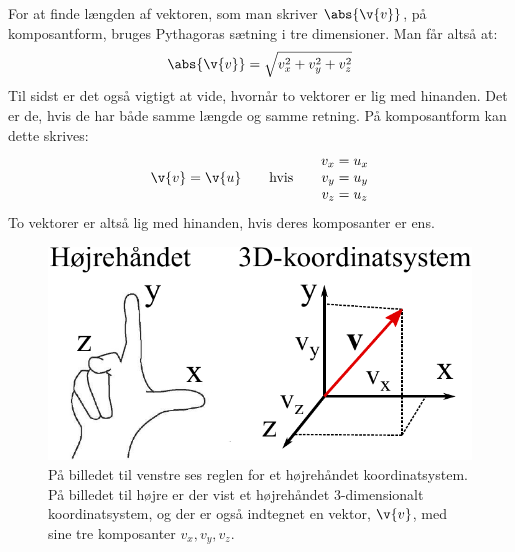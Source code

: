 For at finde længden af vektoren, som man skriver $\abs{\v{v}}$, på komposantform, bruges Pythagoras sætning i tre dimensioner. Man får altså at:
\begin{equation}
\abs{\v{v}} = \sqrt{v_x^2 + v_y^2 + v_z^2}
\label{length}
\end{equation} 
Til sidst er det også vigtigt at vide, hvornår to vektorer er lig med hinanden. Det er de, hvis de har både samme længde og samme retning. På komposantform kan dette skrives:
\begin{equation}
\v{v} = \v{u} \quad \quad \text{hvis} \quad \quad
\begin{matrix}
v_x = u_x \\
v_y = u_y \\
v_z = u_z \\
\end{matrix}
\end{equation}
To vektorer er altså lig med hinanden, hvis deres komposanter er ens.
\begin{figure}[h!]
	\centering
	\includegraphics[scale=0.9]{matematik/fig/koordsys}
	\caption{På billedet til venstre ses reglen for et højrehåndet koordinatsystem. På billedet til højre er der vist et højrehåndet 3-dimensionalt koordinatsystem, og der er også indtegnet en vektor, $\v{v}$, med sine tre komposanter $v_x,  v_y,  v_z$.}
	\label{koordsys}
\end{figure}

